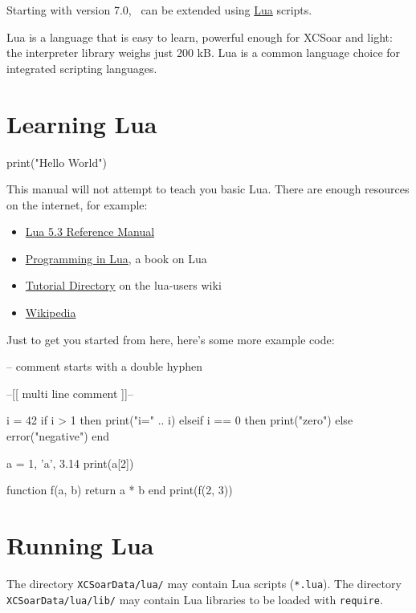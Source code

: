 {\lstset{language=[5.0]Lua}}
{}

Starting with version 7.0, \xc\ can be extended using
\href{http://www.lua.org/}{Lua} scripts.

Lua is a language that is easy to learn, powerful enough for XCSoar
and light: the interpreter library weighs just 200 kB.  Lua is a
common language choice for integrated scripting languages.

\section{Learning Lua}

\begin{lua}
print("Hello World")
\end{lua}

This manual will not attempt to teach you basic Lua.  There are enough
resources on the internet, for example:

\begin{itemize}
\item \href{http://www.lua.org/manual/5.3/}{Lua 5.3 Reference Manual}
\item \href{http://www.lua.org/pil/contents.html}{Programming in
  Lua}, a book on Lua
\item \href{http://lua-users.org/wiki/TutorialDirectory}{Tutorial
  Directory} on the lua-users wiki
\item \href{https://en.wikipedia.org/wiki/Lua_%28programming_language%29}{Wikipedia}
\end{itemize}

Just to get you started from here, here's some more example code:

\begin{lua}
-- comment starts with a double hyphen

--[[
multi
line
comment
]]--

i = 42
if i > 1 then
   print("i=" .. i)
elseif i == 0 then
   print("zero")
else
   error("negative")
end

a = {1, 'a', 3.14}
print(a[2])

function f(a, b)
   return a * b
end
print(f(2, 3))
\end{lua}

\section{Running Lua}

The directory \texttt{XCSoarData/lua/} may contain Lua scripts
(\texttt{*.lua}).  The directory \texttt{XCSoarData/lua/lib/} may
contain Lua libraries to be loaded with \texttt{require}.

